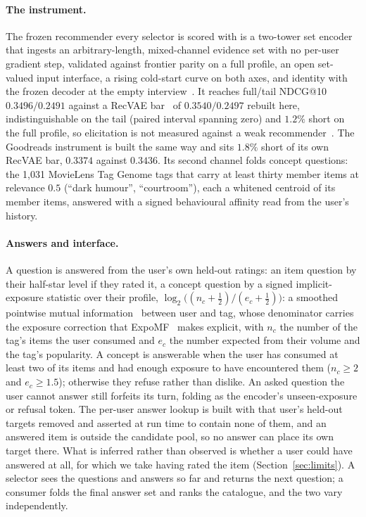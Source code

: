 \documentclass[runningheads]{llncs}
\begin{document}
\paragraph{The instrument.}
The frozen recommender every selector is scored with is a two-tower set encoder that ingests an
arbitrary-length, mixed-channel evidence set with no per-user gradient step, validated against
frontier parity on a full profile, an open set-valued input interface, a rising cold-start curve on
both axes, and identity with the frozen decoder at the empty interview~\cite{anon_instrument}. It reaches full/tail NDCG@10 $0.3496/0.2491$ against a RecVAE bar~\cite{ren2020recvae} of
$0.3540/0.2497$ rebuilt here, indistinguishable on the tail (paired interval spanning zero) and
$1.2\%$ short on the full profile, so elicitation is not measured against a weak
recommender~\cite{dacrema2019progress,steck2019ease}. The Goodreads instrument is built the same way
and sits $1.8\%$ short of its own RecVAE bar, $0.3374$ against $0.3436$. Its second channel folds concept questions: the
1{,}031 MovieLens Tag Genome tags that carry at least thirty member items at relevance $0.5$
(``dark humour'', ``courtroom''), each a whitened centroid of its
member items, answered with a signed behavioural affinity read from the user's history.

\paragraph{Answers and interface.}
A question is answered from the user's own held-out ratings: an item question by their half-star level
if they rated it, a concept question by a signed implicit-exposure statistic over their profile,
$\log_2\!\big((n_c+\tfrac12)/(e_c+\tfrac12)\big)$: a smoothed pointwise mutual
information~\cite{church1990word} between user and tag, whose denominator carries the exposure
correction that ExpoMF~\cite{liang2016expomf} makes explicit, with $n_c$ the number of the tag's
items the user consumed and $e_c$ the number expected from their volume and the tag's popularity. A concept is answerable when the user has consumed at least two of its items and had enough
exposure to have encountered them ($n_c\ge2$ and $e_c\ge1.5$); otherwise they refuse rather than
dislike. An asked question the user cannot answer still forfeits its turn, folding as the encoder's
unseen-exposure or refusal token. The per-user answer lookup is built with that user's held-out
targets removed and asserted at run time to contain none of them, and an answered item is outside the
candidate pool, so no answer can place its own target there. What is inferred rather than observed is
whether a user could have answered at all, for which we take having rated the
item (Section~\ref{sec:limits}). A selector sees the questions and answers so far and returns the
next question; a consumer folds the final answer set and ranks the catalogue, and the two vary
independently.
\end{document}
